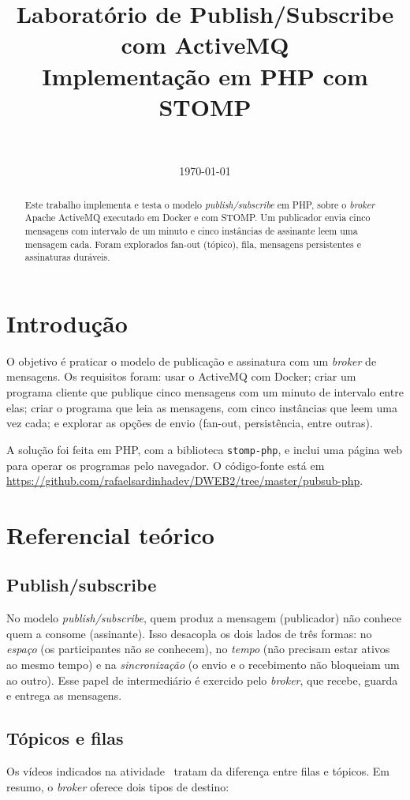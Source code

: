 \documentclass[11pt,a4paper]{article}
\title{Laborat\'orio de Publish/Subscribe com ActiveMQ\\[2pt]
\large Implementa\c{c}\~ao em PHP com STOMP}
\author{\autor\\ \disciplina}
\date{\today}
\newcommand{\linkrepo}{\url{https://github.com/rafaelsardinhadev/DWEB2/tree/master/pubsub-php}}
\begin{document}
\maketitle

\begin{abstract}
Este trabalho implementa e testa o modelo \textit{publish/subscribe} em PHP, sobre o
\textit{broker} Apache ActiveMQ executado em Docker e com STOMP. Um
publicador envia cinco mensagens com intervalo de um minuto e cinco inst\^ancias de
assinante leem uma mensagem cada. Foram explorados fan-out (t\'opico), fila, mensagens
persistentes e assinaturas dur\'aveis.
\end{abstract}

\section{Introdu\c{c}\~ao}

O objetivo \'e praticar o modelo de publica\c{c}\~ao e assinatura com um
\textit{broker} de mensagens. Os requisitos foram: usar o ActiveMQ com Docker; criar um
programa cliente que publique cinco mensagens com um minuto de intervalo entre elas;
criar o programa que leia as mensagens, com cinco inst\^ancias que leem uma vez cada; e
explorar as op\c{c}\~oes de envio (fan-out, persist\^encia, entre outras).

A solu\c{c}\~ao foi feita em PHP, com a biblioteca \texttt{stomp-php}, e inclui uma
p\'agina web para operar os programas pelo navegador. O c\'odigo-fonte est\'a em \linkrepo.

\section{Referencial te\'orico}

\subsection{Publish/subscribe}
No modelo \textit{publish/subscribe}, quem produz a mensagem (publicador) n\~ao
conhece quem a consome (assinante). Isso desacopla os dois lados de tr\^es formas: no
\emph{espa\c{c}o} (os participantes n\~ao se conhecem), no \emph{tempo} (n\~ao precisam estar
ativos ao mesmo tempo) e na \emph{sincroniza\c{c}\~ao} (o envio e o recebimento n\~ao
bloqueiam um ao outro). Esse papel de intermedi\'ario \'e exercido pelo \textit{broker},
que recebe, guarda e entrega as mensagens.

\subsection{T\'opicos e filas}
Os v\'ideos indicados na atividade~\cite{savoir,redblack} tratam da diferen\c{c}a entre
filas e t\'opicos. Em resumo, o \textit{broker} oferece dois tipos de destino:
\end{document}
